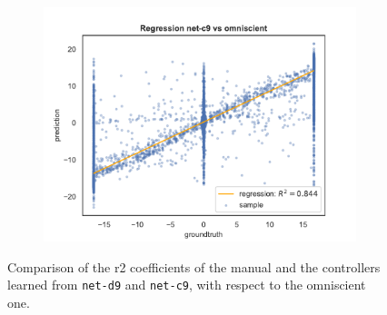 \begin{figure}[!htb]
\begin{center}
\begin{subfigure}[h]{0.49\textwidth}
		\end{subfigure}
	\end{center}
	\vspace{-0.5cm}
	\begin{center}
		\begin{subfigure}[h]{0.49\textwidth}
			\includegraphics[width=\textwidth]{contents/images/net-c9/regression-net-c9-vs-omniscient}
		\end{subfigure}
	\end{center}
	\vspace{-0.5cm}
	\caption[Evaluation of the \gls{r2} coefficients of \texttt{net-c9}.]{Comparison 
		of the \gls{r2} coefficients of the manual and the controllers learned from 
		\texttt{net-d9} and \texttt{net-c9}, with respect to the omniscient one.}
	\label{fig:net-c9r2}
\end{figure}

